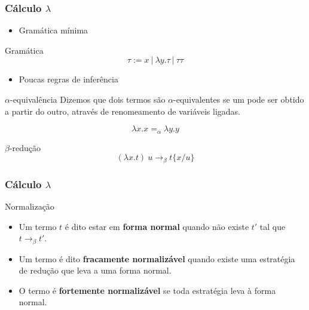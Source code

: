 \documentclass{beamer}
\begin{document}
\begin{frame}
\frametitle{Cálculo $\lambda$}

\begin{itemize}
\item Gramática mínima 
\end{itemize}


\begin{block}{Gramática}
\[ \tau := x\ |\ \lambda y.\tau\ |\ \tau \tau \]
\end{block}

\begin{itemize}
\item Poucas regras de inferência
\end{itemize}

\begin{block}{ $\alpha$-equivalência }
    Dizemos que dois termos são $\alpha$-equivalentes se um pode ser obtido a
    partir do outro, através de renomeamento de variáveis ligadas.

    \[ \lambda x. x =_{\alpha} \lambda y. y \] 
\end{block}

\begin{block}{$\beta$-redução}
\[ (\lambda x.t)\ u \rightarrow_{\beta} t\{x/u\} \]
\end{block}

\end{frame}



\begin{frame}
\frametitle{Cálculo $\lambda$}

\begin{block}{ Normalização }
\begin{itemize}
    \item Um termo $t$ é dito estar em \textbf{forma normal} quando não existe
        $t'$ tal que $ t \rightarrow_{\beta} t' $.
    \item Um termo é dito \textbf{fracamente normalizável} quando
    existe uma estratégia de redução que leva a uma forma normal.
    \item O termo é \textbf{fortemente normalizável} se toda estratégia leva à
        forma normal.
\end{itemize}

\end{block}

\end{frame}
\end{document}
